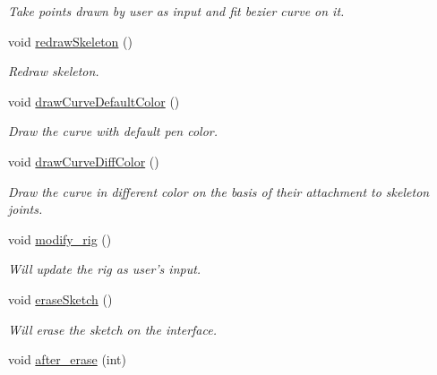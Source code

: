 \begin{DoxyCompactItemize}
\begin{DoxyCompactList}\small\item\em \-Take points drawn by user as input and fit bezier curve on it. \end{DoxyCompactList}\item 
void \hyperlink{classScribbleArea_a78d0c2e760aa2969a7ae398c7988da3c}{redraw\-Skeleton} ()
\begin{DoxyCompactList}\small\item\em \-Redraw skeleton. \end{DoxyCompactList}\item 
\hypertarget{classScribbleArea_a1316894d6e0dbc0381f9a76a8c9db99a}{void \hyperlink{classScribbleArea_a1316894d6e0dbc0381f9a76a8c9db99a}{draw\-Curve\-Default\-Color} ()}\label{classScribbleArea_a1316894d6e0dbc0381f9a76a8c9db99a}

\begin{DoxyCompactList}\small\item\em \-Draw the curve with default pen color. \end{DoxyCompactList}\item 
\hypertarget{classScribbleArea_ac50cd5d2636b2feeb53eecd71fa36e66}{void \hyperlink{classScribbleArea_ac50cd5d2636b2feeb53eecd71fa36e66}{draw\-Curve\-Diff\-Color} ()}\label{classScribbleArea_ac50cd5d2636b2feeb53eecd71fa36e66}

\begin{DoxyCompactList}\small\item\em \-Draw the curve in different color on the basis of their attachment to skeleton joints. \end{DoxyCompactList}\item 
void \hyperlink{classScribbleArea_a2ac8f20092fbf7d2948dbf84204882cc}{modify\-\_\-rig} ()
\begin{DoxyCompactList}\small\item\em \-Will update the rig as user's input. \end{DoxyCompactList}\item 
\hypertarget{classScribbleArea_ad8f7b63e8589290ec3dd163ec9033519}{void \hyperlink{classScribbleArea_ad8f7b63e8589290ec3dd163ec9033519}{erase\-Sketch} ()}\label{classScribbleArea_ad8f7b63e8589290ec3dd163ec9033519}

\begin{DoxyCompactList}\small\item\em \-Will erase the sketch on the interface. \end{DoxyCompactList}\item 
\hypertarget{classScribbleArea_ab3f4452e27b6a1259d6a85400e9a3fcf}{void \hyperlink{classScribbleArea_ab3f4452e27b6a1259d6a85400e9a3fcf}{after\-\_\-erase} (int)}\label{classScribbleArea_ab3f4452e27b6a1259d6a85400e9a3fcf}


\end{DoxyCompactItemize}
